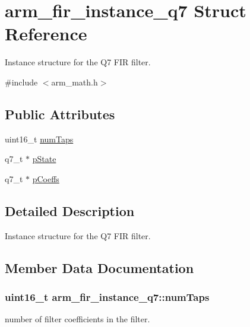 \hypertarget{structarm__fir__instance__q7}{}\section{arm\+\_\+fir\+\_\+instance\+\_\+q7 Struct Reference}
\label{structarm__fir__instance__q7}


Instance structure for the Q7 F\+IR filter.  




{\ttfamily \#include $<$arm\+\_\+math.\+h$>$}

\subsection*{Public Attributes}
\begin{DoxyCompactItemize}
\item 
uint16\+\_\+t \hyperlink{structarm__fir__instance__q7_a9b50840e2c5ef5b17e1a584fb4cf0d06}{num\+Taps}
\item 
q7\+\_\+t $\ast$ \hyperlink{structarm__fir__instance__q7_aaddea3b9c7e16ddfd9428b7bf9f9c200}{p\+State}
\item 
q7\+\_\+t $\ast$ \hyperlink{structarm__fir__instance__q7_a0e45aedefc3fffad6cb315c5b6e5bd49}{p\+Coeffs}
\end{DoxyCompactItemize}


\subsection{Detailed Description}
Instance structure for the Q7 F\+IR filter. 

\subsection{Member Data Documentation}
\subsubsection[{\texorpdfstring{num\+Taps}{numTaps}}]{\setlength{\rightskip}{0pt plus 5cm}uint16\+\_\+t arm\+\_\+fir\+\_\+instance\+\_\+q7\+::num\+Taps}\hypertarget{structarm__fir__instance__q7_a9b50840e2c5ef5b17e1a584fb4cf0d06}{}\label{structarm__fir__instance__q7_a9b50840e2c5ef5b17e1a584fb4cf0d06}
number of filter coefficients in the filter. 
